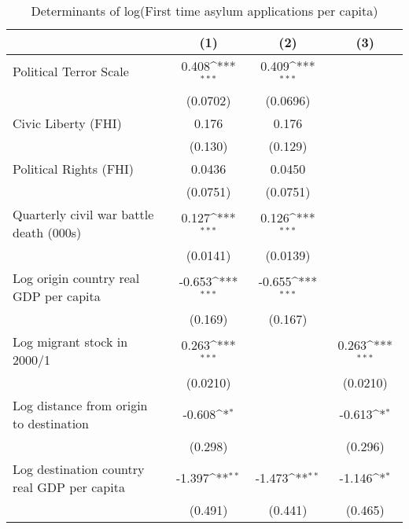 \begin{table}[htbp]\centering
\def\sym#1{\ifmmode^{#1}\else\(^{#1}\)\fi}
\caption{Determinants of log(First time asylum applications per capita)}
\begin{tabular}{l*{3}{c}}
\hline\hline
                    &\multicolumn{1}{c}{(1)}         &\multicolumn{1}{c}{(2)}         &\multicolumn{1}{c}{(3)}         \\
\hline
Political Terror Scale&       0.408\sym{***}&       0.409\sym{***}&                     \\
                    &    (0.0702)         &    (0.0696)         &                     \\
[1em]
Civic Liberty (FHI) &       0.176         &       0.176         &                     \\
                    &     (0.130)         &     (0.129)         &                     \\
[1em]
Political Rights (FHI)&      0.0436         &      0.0450         &                     \\
                    &    (0.0751)         &    (0.0751)         &                     \\
[1em]
Quarterly civil war battle death (000s)&       0.127\sym{***}&       0.126\sym{***}&                     \\
                    &    (0.0141)         &    (0.0139)         &                     \\
[1em]
Log origin country real GDP per capita&      -0.653\sym{***}&      -0.655\sym{***}&                     \\
                    &     (0.169)         &     (0.167)         &                     \\
[1em]
Log migrant stock in 2000/1&       0.263\sym{***}&                     &       0.263\sym{***}\\
                    &    (0.0210)         &                     &    (0.0210)         \\
[1em]
Log distance from origin to destination&      -0.608\sym{*}  &                     &      -0.613\sym{*}  \\
                    &     (0.298)         &                     &     (0.296)         \\
[1em]
Log destination country real GDP per capita&      -1.397\sym{**} &      -1.473\sym{**} &      -1.146\sym{*}  \\
                    &     (0.491)         &     (0.441)         &     (0.465)         \\

\end{tabular}
\end{table}
